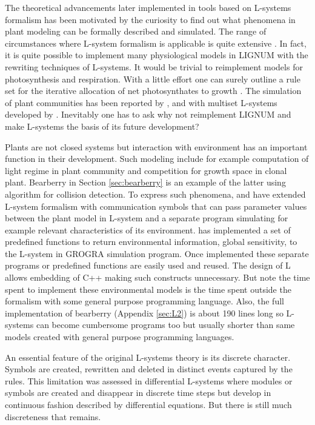The  theoretical  advancements later  implemented  in  tools based  on
L-systems formalism  has been motivated  by the curiosity to  find out
what  phenomena  in  plant  modeling  can be  formally  described  and
simulated.   The range  of circumstances  where L-system  formalism is
applicable  is quite extensive  \citep{pp:99}.  In  fact, it  is quite
possible  to implement many  physiological models  in LIGNUM  with the
rewriting techniques of L-systems.  It would be trivial to reimplement
models for  photosynthesis and respiration.  With a  little effort one
can  surely outline a  rule set  for the  iterative allocation  of net
photosynthates    to    growth   \citep{perttunen:96,    perttunen:98,
  perttunen:01}.   The  simulation   of  plant  communities  has  been
reported  by \citet{deussen:98},  \citet{kurth:99}  and with  multiset
L-systems developed by \citet{lane:02}.  Inevitably one has to ask why
not  reimplement LIGNUM  and make  L-systems the  basis of  its future
development?

Plants are not closed systems  but interaction with environment has an
important function  in their  development.  Such modeling  include for
example computation of light regime in plant community and competition
for   growth   space   in   clonal  plant.    Bearberry   in   Section
\ref{sec:bearberry} is  an example of  the latter using  algorithm for
collision detection.   To express such  phenomena, \citet{mech:97} and
\citet{mech:96}  have extended  L-system formalism  with communication
symbols  that can  pass parameter  values between  the plant  model in
L-system  and  a  separate  program simulating  for  example  relevant
characteristics of its  environment.  \citet{kurth:94} has implemented
a  set of  predefined functions  to return  environmental information,
global  sensitivity, to  the  L-system in  GROGRA simulation  program.
Once implemented  these separate programs or  predefined functions are
easily used and reused. The design of L allows embedding of C++ making
such  constructs unnecessary.  But  note the  time spent  to implement
these  environmental models is  the time  spent outside  the formalism
with  some  general  purpose  programming language.   Also,  the  full
implementation of bearberry (Appendix \ref{sec:L2}) is about 190 lines
long  so L-systems  can  become cumbersome  programs  too but  usually
shorter  than same  models  created with  general purpose  programming
languages.
 
An essential feature of the  original L-systems theory is its discrete
character.   Symbols are  created, rewritten  and deleted  in distinct
events  captured  by  the  rules.   This limitation  was  assessed  in
differential L-systems \citep{hammel:96}  where modules or symbols are
created and disappear in discrete time steps but develop in continuous
fashion described  by differential equations. But there  is still much
discreteness that remains.

